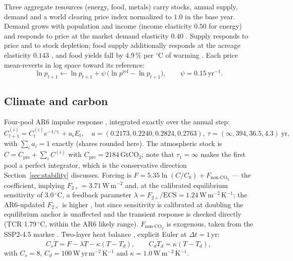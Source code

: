 \documentclass[12pt,a4paper]{article}
\newcommand{\degC}{$^{\circ}$C}
\begin{document}
Three aggregate resources (energy, food, metals) carry stocks, annual supply, demand and a
world clearing price index normalized to $1.0$ in the base year. Demand grows with population
and income (income elasticity $0.50$ for energy) and responds to price at the market demand
elasticity $0.40$ \citep{labandeira2017}. Supply responds to price and to stock depletion;
food supply additionally responds at the acreage elasticity $0.143$ \citep{haile2016}, and food
yields fall by $4.9\,\%$ per \degC{} of warming \citep{zhao2017}. Each price mean-reverts in
log space toward its reference:
\begin{equation}
\ln p_{t+1} \leftarrow \ln p_{t+1} + \psi\,\big(\ln p^{\mathrm{ref}} - \ln p_{t+1}\big),
\qquad \psi = 0.15\ \text{yr}^{-1}.
\label{eq:priceanchor}
\end{equation}

\subsection{Climate and carbon}

Four-pool AR6 impulse response \citep{joos2013}, integrated exactly over the annual step:
\begin{equation}
C^{(i)}_{t+1} = C^{(i)}_t e^{-1/\tau_i} + a_i E_t,\quad
a=(0.2173,0.2240,0.2824,0.2763),\ \tau=(\infty,394,36.5,4.3)\ \text{yr},
\label{eq:pools}
\end{equation}
with $\sum_i a_i = 1$ exactly (shares rounded here). The atmospheric stock is
$C = C_{\mathrm{pre}} + \sum_i C^{(i)}$ with $C_{\mathrm{pre}}=2184$\,GtCO$_2$; note that
$\tau_1=\infty$ makes the first pool a perfect integrator, which is the conservative direction
Section~\ref{sec:stability} discusses. Forcing is
$F=5.35\ln(C/C_0)+F_{\text{non-CO}_2}$ --- the \citet{myhre1998} coefficient, implying
$F_{2\times}=3.71$\,W\,m$^{-2}$ and, at the calibrated equilibrium sensitivity of $3.0$\,\degC,
a feedback parameter $\lambda=F_{2\times}/\mathrm{ECS}=1.24$\,W\,m$^{-2}$\,K$^{-1}$; the
AR6-updated $F_{2\times}$ is higher \citep{forster2021}, but since sensitivity is calibrated at
doubling the equilibrium anchor is unaffected and the transient response is checked directly
(TCR $1.79$\,\degC, within the AR6 likely range). $F_{\text{non-CO}_2}$ is exogenous, taken
from the SSP2-4.5 marker \citep{meinshausen2020}. Two-layer heat balance
\citep{geoffroy2013}, explicit Euler at $\Delta t=1$\,yr:
\begin{equation}
C_s\dot T = F - \lambda T - \kappa(T-T_d), \qquad C_d\dot T_d = \kappa(T-T_d),
\label{eq:ebm}
\end{equation}
with $C_s=8$, $C_d=100$\,W\,yr\,m$^{-2}$\,K$^{-1}$ and $\kappa=1.0$\,W\,m$^{-2}$\,K$^{-1}$.
\end{document}
